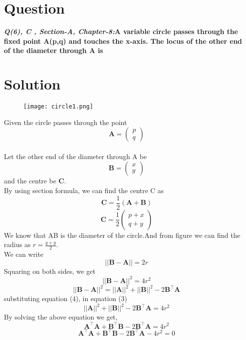 \documentclass[10pt, a4paper]{article}
\title{\mytitle}
\author{\myauthor\hspace{1em}\\\contact\\FWC22097 -\hspace{0.5em}IITH\hspace{0.5em}\mymodule\hspace{6em}}
\date{}
\newcommand{\myvec}[1]{\ensuremath{\begin{pmatrix}#1\end{pmatrix}}}
\let\vec\mathbf
\begin{document}
\maketitle


\section{Question}
\textbf{\textit{Q(6), C , Section-A, Chapter-8:}A variable circle passes through the fixed point A(p,q) and touches the x-axis. The locus of the other end of the diameter through  A is }

\section{Solution}
\raggedright 

\begin{figure}[h!]
\centering
\texttt{[image: circle1.png]} \\
\end{figure}

\vspace{0.25cm}
Given the circle passes through the point $$\vec{A}=\myvec{ p \\ q }$$\\
Let the other end of the diameter through A be $$\vec{B}=\myvec{ x \\ y }$$ and the centre be $\vec{C}$. \\
By using section formula, we can find the centre C as\\
\begin{equation}
\vec{C}=\frac{1}{2}(\vec{A}+\vec{B})
\end{equation}
$$\vec{C}=\frac{1}{2}\myvec{p+x \\ q+y}$$ 
We know that AB is the diameter of the circle.And from figure we can find the radius as $r=\frac{q+y}{2}$. \\ We can write\\
\begin{equation}
||\vec{B-A}||= 2r
\end{equation}
Squaring on both sides, we get
\begin{equation}
||\vec{B-A}||^2= 4r^2
\end{equation}
\begin{equation}
||\vec{B-A}||^2=||\vec{A}||^2+||\vec{B}||^2-2{\vec{B}}^{\top}\vec{A}
\end{equation}
substituting equation (4), in equation (3)
\begin{equation}
||\vec{A}||^2+||\vec{B}||^2-2{\vec{B}}^{\top}\vec{A}=4r^2
\end{equation}
By solving the above equation we get,
\begin{equation}
\vec{A}^{\top}\vec{A}+\vec{B}^{\top}\vec{B}-2{\vec{B}}^{\top}\vec{A}=4r^2
\end{equation}
\begin{equation}
\vec{A}^{\top}\vec{A}+\vec{B}^{\top}\vec{B}-2{\vec{B}}^{\top}\vec{A}-4r^2=0
\end{equation}
\end{document}
